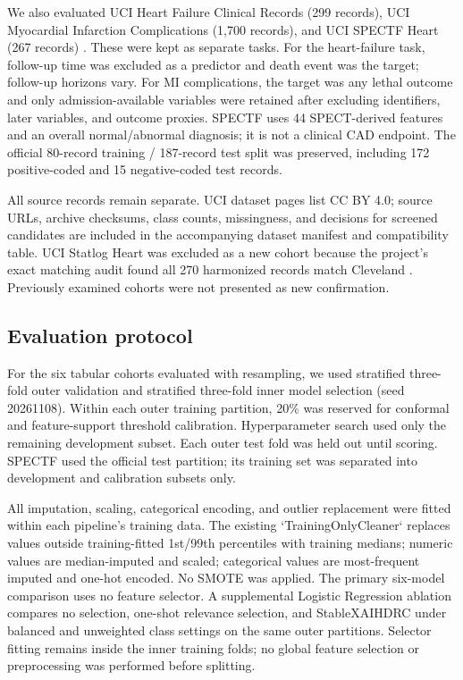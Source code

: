 \documentclass[conference]{IEEEtran}
\begin{document}
We also evaluated UCI Heart Failure Clinical Records (299 records), UCI Myocardial Infarction Complications (1,700 records), and UCI SPECTF Heart (267 records) \cite{ucihf519,ucimi579,ucispectf}. These were kept as separate tasks. For the heart-failure task, follow-up time was excluded as a predictor and death event was the target; follow-up horizons vary. For MI complications, the target was any lethal outcome and only admission-available variables were retained after excluding identifiers, later variables, and outcome proxies. SPECTF uses 44 SPECT-derived features and an overall normal/abnormal diagnosis; it is not a clinical CAD endpoint. The official 80-record training / 187-record test split was preserved, including 172 positive-coded and 15 negative-coded test records.

All source records remain separate. UCI dataset pages list CC BY 4.0; source URLs, archive checksums, class counts, missingness, and decisions for screened candidates are included in the accompanying dataset manifest and compatibility table. UCI Statlog Heart was excluded as a new cohort because the project’s exact matching audit found all 270 harmonized records match Cleveland \cite{ucistatlog}. Previously examined cohorts were not presented as new confirmation.

\begin{table}[t]
\centering
\caption{Dataset characteristics. CAD cohorts share the UCI angiographic endpoint; heart failure, MI, and SPECTF are different tasks. Class counts are negative/positive.}
\label{tab:datasets}
\scriptsize

\end{table}

\subsection{Evaluation protocol}
For the six tabular cohorts evaluated with resampling, we used stratified three-fold outer validation and stratified three-fold inner model selection (seed 20261108). Within each outer training partition, 20\% was reserved for conformal and feature-support threshold calibration. Hyperparameter search used only the remaining development subset. Each outer test fold was held out until scoring. SPECTF used the official test partition; its training set was separated into development and calibration subsets only.

All imputation, scaling, categorical encoding, and outlier replacement were fitted within each pipeline’s training data. The existing `TrainingOnlyCleaner` replaces values outside training-fitted 1st/99th percentiles with training medians; numeric values are median-imputed and scaled; categorical values are most-frequent imputed and one-hot encoded. No SMOTE was applied. The primary six-model comparison uses no feature selector. A supplemental Logistic Regression ablation compares no selection, one-shot relevance selection, and StableXAIHDRC under balanced and unweighted class settings on the same outer partitions. Selector fitting remains inside the inner training folds; no global feature selection or preprocessing was performed before splitting.
\end{document}
